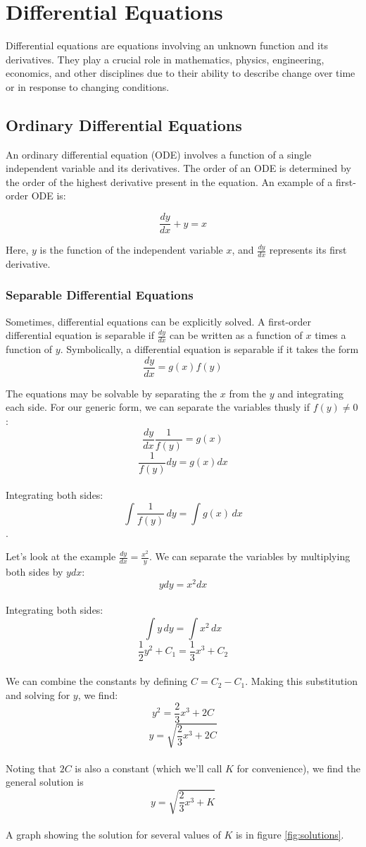 \chapter{Differential Equations}

Differential equations are equations involving an unknown function and
its derivatives. They play a crucial role in mathematics, physics,
engineering, economics, and other disciplines due to their ability to
describe change over time or in response to changing conditions.

\section{Ordinary Differential Equations}

An ordinary differential equation (ODE) involves a function of a
single independent variable and its derivatives. The order of an ODE
is determined by the order of the highest derivative present in the
equation. An example of a first-order ODE is: 

\begin{equation}
\frac{dy}{dx} + y = x
\end{equation}

Here, $y$ is the function of the independent variable $x$, and 
$\frac{dy}{dx}$ represents its first derivative.

\subsection{Separable Differential Equations}
Sometimes, differential equations can be explicitly solved. A 
first-order differential equation is separable if $\frac{dy}{dx}$ can 
be written as a function of $x$ times a function of $y$. Symbolically, 
a differential equation is separable if it takes the form 
$$\frac{dy}{dx} = g(x)f(y)$$

The equations may be solvable by separating the $x$ from the $y$ and 
integrating each side. For our generic form, we can separate the 
variables thusly if $f(y) \neq 0$: 
$$\frac{dy}{dx}\frac{1}{f(y)} = g(x)$$ 
$$\frac{1}{f(y)}dy = g(x) dx$$ \\
Integrating both sides: $$\int \frac{1}{f(y)}\,dy = \int g(x)\,dx$$.

Let's look at the example $\frac{dy}{dx} = \frac{x^2}{y}$. We can 
separate the variables by multiplying both sides by $y dx$: 
$$y dy = x^2 dx$$\\
Integrating both sides: 
$$\int y\,dy = \int x^2\,dx$$
$$\frac{1}{2}y^2 + C_1 = \frac{1}{3}x^3 + C_2$$ \\
We can combine the constants by defining $C = C_2 - C_1$. Making this 
substitution and solving for $y$, we find: 
$$y^2 = \frac{2}{3} x^3 + 2C$$ 
$$y = \sqrt{\frac{2}{3} x^3 + 2C}$$\\
Noting that $2C$ is also a constant (which we'll call $K$ for 
convenience), we find the general solution is 
$$y = \sqrt{\frac{2}{3} x^3 + K}$$ \\
A graph showing the solution for several values of $K$ is in figure 
\ref{fig:solutions}.

